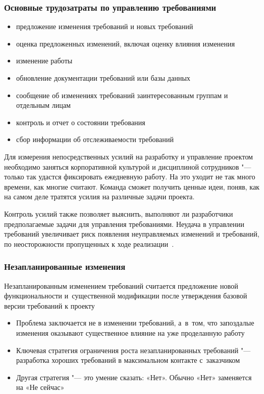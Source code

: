 \documentclass{../industrial-development}
\begin{document}
\begin{frame} \frametitle{Основные трудозатраты по управлению требованиями}
	\begin{itemize}
\item предложение изменения требований и новых требований
\item оценка предложенных изменений, включая оценку влияния изменения
\item изменение работы
\item обновление документации требований или базы данных
\item сообщение об изменениях требований заинтересованным группам и отдельным лицам
\item контроль и отчет о состоянии требования
\item сбор информации об отслеживаемости требований
  	\end{itemize}
\end{frame}

\lecturenotes

Для измерения непосредственных усилий на разработку и управление проектом необходимо заняться корпоративной культурой и дисциплиной сотрудников "--- только так удастся фиксировать ежедневную работу. На это уходит не так много времени, как многие считают. Команда сможет получить ценные идеи, поняв, как на самом деле тратятся усилия на различные задачи проекта.

Контроль усилий также позволяет выяснить, выполняют ли разработчики предполагаемые задачи для управления требованиями. Неудача в управлении требований увеличивает риск появления неуправляемых изменений и требований, по неосторожности пропущенных к ходе реализации~\cite[с.~354]{Wiegers}.



\begin{frame} \frametitle{Незапланированные изменения}
  \begin{block}{}
Незапланированным изменением требований считается предложение новой функциональности и~существенной модификации после утверждения базовой версии требований к проекту
  \end{block}
	\begin{itemize}
\item Проблема заключается не в изменении требований, а~в~том, что запоздалые изменения оказывают существенное влияние на уже проделанную работу
\item Ключевая стратегия ограничения роста незапланированных требований "--- разработка хороших требований в максимальном контакте с~заказчиком
\item Другая стратегия "--- это умение сказать: «Нет». Обычно «Нет» заменяется на «Не сейчас»
  	\end{itemize}
\end{frame}
\end{document}
